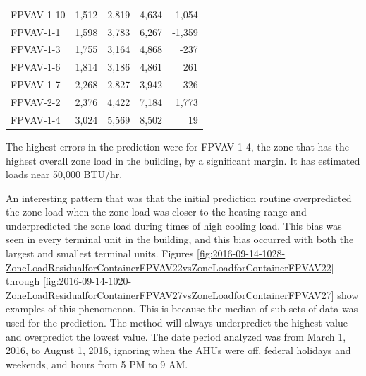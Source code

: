 \begin{table}
\begin{tabular}{lrrrr}
FPVAV-1-10 & 1,512 & 2,819 & 4,634  & 1,054  \\
FPVAV-1-1  & 1,598 & 3,783 & 6,267  & -1,359 \\
FPVAV-1-3  & 1,755 & 3,164 & 4,868  & -237   \\
FPVAV-1-6  & 1,814 & 3,186 & 4,861  & 261    \\
FPVAV-1-7  & 2,268 & 2,827 & 3,942  & -326   \\
FPVAV-2-2  & 2,376 & 4,422 & 7,184  & 1,773  \\
FPVAV-1-4  & 3,024 & 5,569 & 8,502  & 19     \\
    \bottomrule
\end{tabular}
\end{table}

The highest errors in the prediction were for FPVAV-1-4, the zone that
has the highest overall zone load in the building, by a significant
margin. It has estimated loads near 50,000 BTU/hr.



An interesting pattern that was that the initial prediction routine
overpredicted the zone load when the zone load was closer to the heating
range and underpredicted the zone load during times of high cooling
load. This bias was seen in every terminal unit in the building, and this
bias occurred with both the largest and smallest terminal units. Figures
\ref{fig:2016-09-14-1028-ZoneLoadResidualforContainerFPVAV22vsZoneLoadforContainerFPVAV22}
through
\ref{fig:2016-09-14-1020-ZoneLoadResidualforContainerFPVAV27vsZoneLoadforContainerFPVAV27}
show examples of this phenomenon. This is because the
median of sub-sets of data was used for the prediction. The method will
always underpredict the highest value and overpredict the lowest value.
The date period analyzed was from March 1, 2016, to August 1, 2016,
ignoring when the AHUs were off, federal holidays and weekends, and
hours from 5 PM to 9 AM. 

\newcommand{\zoneLoadCaption}[1]{Bias in zone load prediction for #1.}


